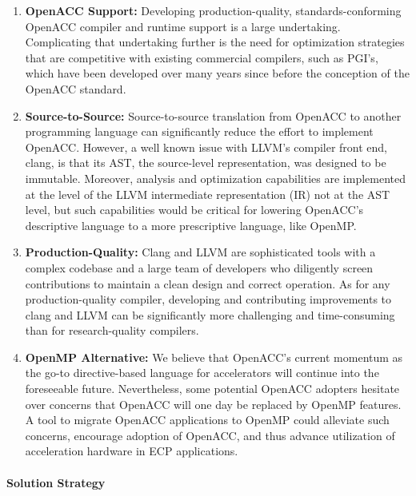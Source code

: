 \begin{enumerate}

\item \textbf{OpenACC Support:} Developing production-quality,
standards-conforming OpenACC compiler and runtime support is a large
undertaking.  Complicating that undertaking further is the need for
optimization strategies that are competitive with existing commercial
compilers, such as PGI's, which have been developed over many years since
before the conception of the OpenACC standard.

\item \textbf{Source-to-Source:} Source-to-source translation from OpenACC
to another programming language can significantly reduce the effort to
implement OpenACC.  However, a well known issue with LLVM's compiler front
end, clang, is that its AST, the source-level representation, was designed
to be immutable.  Moreover, analysis and optimization capabilities are
implemented at the level of the LLVM intermediate representation (IR) not at
the AST level, but such capabilities would be critical for lowering
OpenACC's descriptive language to a more prescriptive language, like OpenMP.

\item \textbf{Production-Quality:} Clang and LLVM are sophisticated tools
with a complex codebase and a large team of developers who diligently screen
contributions to maintain a clean design and correct operation.  As for any
production-quality compiler, developing and contributing improvements to
clang and LLVM can be significantly more challenging and time-consuming than
for research-quality compilers.

\item \textbf{OpenMP Alternative:} We believe that OpenACC's current
momentum as the go-to directive-based language for accelerators will
continue into the foreseeable future.  Nevertheless, some potential OpenACC
adopters hesitate over concerns that OpenACC will one day be replaced by
OpenMP features.  A tool to migrate OpenACC applications to OpenMP could
alleviate such concerns, encourage adoption of OpenACC, and thus advance
utilization of acceleration hardware in ECP applications.

\end{enumerate}

\paragraph{Solution Strategy}

